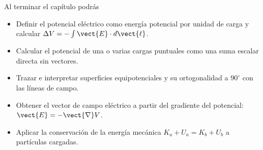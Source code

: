 \documentclass[11pt]{article}
\begin{document}

\begin{minipage}[c]{0.58\linewidth}
{\eTitleFont\color{e10primary}Al terminar el capítulo podrás}
\begin{itemize}[leftmargin=*,itemsep=1pt,topsep=2pt]
  \item Definir el potencial eléctrico como energía potencial por unidad de carga y calcular $\Delta V=-\int\vect{E}\cdot d\vect{\ell}$.
  \item Calcular el potencial de una o varias cargas puntuales como una suma escalar directa sin vectores.
  \item Trazar e interpretar superficies equipotenciales y su ortogonalidad a $90^\circ$ con las líneas de campo.
  \item Obtener el vector de campo eléctrico a partir del gradiente del potencial: $\vect{E}=-\vect{\nabla}V$.
  \item Aplicar la conservación de la energía mecánica $K_a+U_a=K_b+U_b$ a partículas cargadas.
\end{itemize}
\end{minipage}\hfill
\begin{minipage}[c]{0.38\linewidth}
\begin{center}
\end{center}
\end{minipage}
\end{document}

